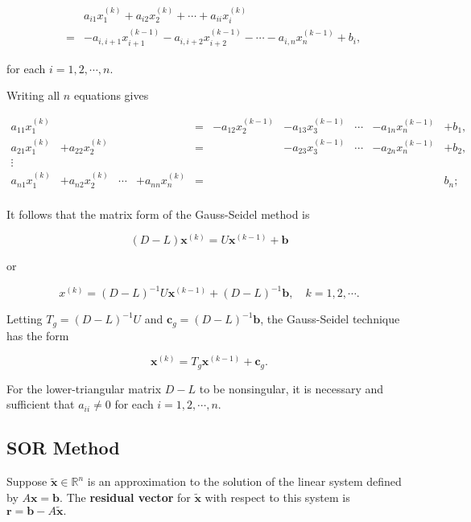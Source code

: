 \documentclass[preprint,12pt]{elsarticle}
\begin{document}
\begin{eqnarray*}
&&a_{i1}x_1^{(k)}+a_{i2}x_2^{(k)}+\cdots+a_{ii}x_i^{(k)}\\
&=&-a_{i,i+1}x_{i+1}^{(k-1)}-a_{i,i+2}x_{i+2}^{(k-1)}-\cdots-a_{i,n}x_n^{(k-1)}+b_i,
\end{eqnarray*}

for each $i = 1, 2,\cdots, n$.

Writing all $n$ equations gives

$$
  \begin{array}{cccccccccc}
    a_{11}x_1^{(k)} &                  &           &                  & = & -a_{12}x_2^{(k-1)} & -a_{13}x_3^{(k-1)} &\cdots & -a_{1n}x_n^{(k-1)} & +b_1, \\[5pt]
    a_{21}x_1^{(k)} & +a_{22}x_2^{(k)} &           &                  & = &                    & -a_{23}x_3^{(k-1)} &\cdots & -a_{2n}x_n^{(k-1)} & +b_2 ,\\
    \vdots          &                  &           &                  &   &                    &                    &          &                     & \\
    a_{n1}x_1^{(k)} & +a_{n2}x_2^{(k)} &  \cdots   & +a_{nn}x_n^{(k)} & = &                    &                    &          &                     & b_n;\\
  \end{array}
$$

It follows that the matrix form of the Gauss-Seidel method is

\[
(D-L)\mathbf{x}^{(k)}=U\mathbf{x}^{(k-1)}+\mathbf{b}
\]

or

\[
x^{(k)}=(D-L)^{-1}U\mathbf{x}^{(k-1)}+(D-L)^{-1}\mathbf{b},
\quad k=1,2,\cdots.
\]

Letting $T_g = (D - L)^{-1} U$ and $\mathbf{c}_g = (D - L)^{-1}\mathbf{b}$, the Gauss-Seidel technique has the form

\[
\mathbf{x}^{(k)}=T_g\mathbf{x}^{(k-1)}+\mathbf{c}_g.
\]

For the lower-triangular matrix $D - L$ to be nonsingular, it is necessary and sufficient that $a_{ii}\ne 0$ for each $i = 1, 2,\cdots, n$.

\subsection{SOR Method}
\label{SS:2.3}

Suppose $\mathbf{\tilde{x}} \in \mathbb{R}^n$ is an approximation to the solution of the linear system defined by $A\mathbf{x} = \mathbf{b}.$ The \textbf{residual vector} for $\mathbf{\tilde{x}}$ with respect to this system is $\mathbf{r} = \mathbf{b} - A\mathbf{\tilde{x}}.$
\end{document}
